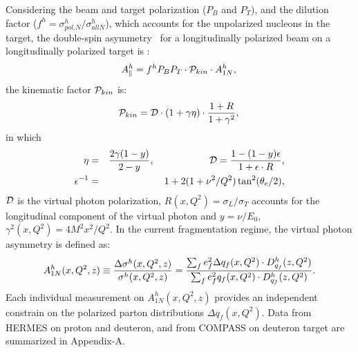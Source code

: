 Considering the beam and target polarization ($P_B$ and $P_T$),
 and the dilution factor ($f^h=\sigma_{pol. N}^h/\sigma_{all N}^h$), which accounts for
the unpolarized nucleons in the target, 
the double-spin asymmetry~\cite{hermesthesis} for a longitudinally polarized 
beam on a longitudinally polarized target is : 
\begin{equation}
A_{\parallel}^h =  f^h P_B P_T \cdot {\cal P}_{kin} \cdot A_{1N}^h, \\
\label{Eq:apara}
\end{equation}  
the kinematic factor ${\cal P}_{kin}$ is: 
\begin{equation}
{\cal P}_{kin}  = {\cal D} \cdot (1+ \gamma \eta) 
\cdot { 1+R \over 1 + \gamma^2 }, \\
\label{Eq:pkin}
\end{equation}  
in which
\begin{eqnarray}
\eta &= & {2 \gamma (1-y) \over 2-y }, \hspace{2.0cm} {\cal D} =  {1-(1-y) \epsilon \over 1+ \epsilon \cdot R }, \nonumber \\
\epsilon^{-1} & = & 1+ 2 ( 1 + {\nu^2 /Q^2} ) \tan^2({\theta_e / 2}),
\end{eqnarray}
 ${\cal D}$ is the virtual photon polarization,
$R(x, Q^2) =  \sigma_L / \sigma_T$ accounts for the 
longitudinal component of the virtual photon 
and $y =  \nu / E_0$, 
$\gamma^2(x,Q^2) = 4 M^2 {x^2 / Q^2}$. 
In the current fragmentation regime, 
the virtual photon asymmetry  
is defined as: 
\begin{equation}
A_{1N}^h(x,Q^2,z)  \equiv {\Delta \sigma^h(x,Q^2,z) \over \sigma^h(x,Q^2,z)}={\sum_{f} e_f^2 \Delta q_f(x,Q^2) \cdot D_{q_f}^{h}(z,Q^2) \over \sum_{f} e_f^2 q_f(x,Q^2) \cdot D_{q_f}^{h}(z,Q^2)}.
\label{Eq:a1h}
\end{equation} 
Each individual measurement on $A_{1N}^h(x,Q^2,z)$ provides an independent constrain on the polarized parton distributions 
$\Delta q_f(x,Q^2)$. Data from HERMES on proton and deuteron, and from COMPASS on deuteron target are summarized in Appendix-A.


